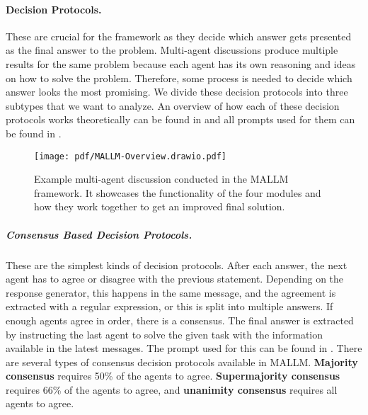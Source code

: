 \paragraph{Decision Protocols.}
These are crucial for the framework as they decide which answer gets presented as the final answer to the problem. Multi-agent discussions produce multiple results for the same problem because each agent has its own reasoning and ideas on how to solve the problem. Therefore, some process is needed to decide which answer looks the most promising. We divide these decision protocols into three subtypes that we want to analyze. An overview of how each of these decision protocols works theoretically can be found in  and all prompts used for them can be found in .

\begin{figure*}[H]
    \centering
    \texttt{[image: pdf/MALLM-Overview.drawio.pdf]}
    \caption{Example multi-agent discussion conducted in the \ac{MALLM} framework. It showcases the functionality of the four modules and how they work together to get an improved final solution.}
    \label{fig:mallm_overview}
\end{figure*}

\subparagraph{Consensus Based Decision Protocols.} 
These are the simplest kinds of decision protocols. After each answer, the next agent has to agree or disagree with the previous statement. Depending on the response generator, this happens in the same message, and the agreement is extracted with a regular expression, or this is split into multiple answers. If enough agents agree in order, there is a consensus. The final answer is extracted by instructing the last agent to solve the given task with the information available in the latest messages. The prompt used for this can be found in . There are several types of consensus decision protocols available in \ac{MALLM}. \textbf{Majority consensus} requires 50\% of the agents to agree. \textbf{Supermajority consensus} requires 66\% of the agents to agree, and \textbf{unanimity consensus} requires all agents to agree.

